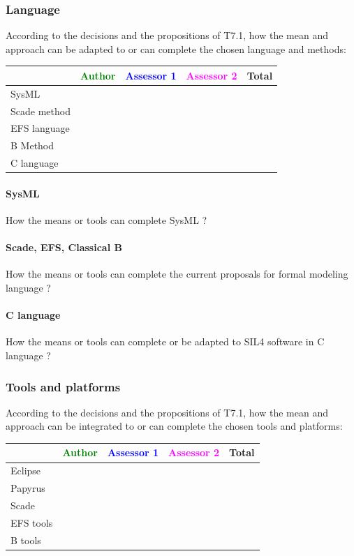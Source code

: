 \subsubsection{Language}


According to the decisions and the propositions of T7.1, how the mean and approach can be adapted to or can complete the chosen language and methods:

\begin{tabular}{|l | c | c | c | c|}
\hline
& \textcolor{green}{Author} & \textcolor{blue}{Assessor 1} & \textcolor{magenta}{Assessor 2} & Total \\
\hline 
SysML  & & & & \\
\hline
Scade method & & & & \\
\hline
EFS language & & & & \\
\hline
B Method & & & & \\
\hline
C language & & & & \\
\hline
\end{tabular}

\paragraph{SysML}
How the means or tools can complete SysML ?


\paragraph{Scade, EFS, Classical B}
How the means or tools can complete the current proposals for formal modeling language ?

\paragraph{C language}
How the means or tools can complete or be adapted to SIL4 software in C language ?

\subsubsection{Tools and platforms}

According to the decisions and the propositions of T7.1, how the mean and approach can be integrated to or can complete the chosen tools and platforms:

\begin{tabular}{|l | c | c | c | c|}
\hline
& \textcolor{green}{Author} & \textcolor{blue}{Assessor 1} & \textcolor{magenta}{Assessor 2} & Total \\
\hline 
Eclipse & & & &  \\
\hline
Papyrus  & & & & \\
\hline
Scade & & & & \\
\hline
EFS tools & & & & \\
\hline
B tools & & & & \\
\hline
\end{tabular}



